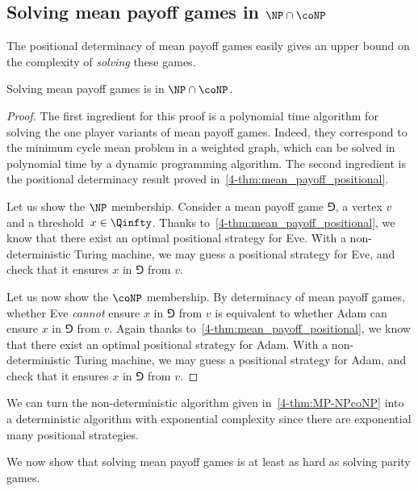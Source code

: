 \subsection*{Solving mean payoff games in $\NP\cap\coNP$}
The positional determinacy of mean payoff games easily gives an upper bound on the complexity of \emph{solving} these games.

\begin{theorem}
\label{4-thm:MP-NPcoNP}
Solving mean payoff games is in $\NP\cap\coNP$.
\end{theorem}
\begin{proof}
The first ingredient for this proof is a polynomial time algorithm for solving the one player variants of mean payoff games.
Indeed, they correspond to the minimum cycle mean problem in a weighted graph,
which can be solved in polynomial time by a dynamic programming algorithm.
The second ingredient is the positional determinacy result proved in~\cref{4-thm:mean_payoff_positional}.

Let us show the $\NP$ membership. 
Consider a mean payoff game $\Game$, a vertex $v$ and a threshold~$x \in \Qinfty$.
Thanks to~\cref{4-thm:mean_payoff_positional}, we know that there exist an optimal positional strategy for Eve.
With a non-deterministic Turing machine, we may guess a positional strategy for Eve, and check that it ensures $x$ in $\Game$ from $v$. 

Let us now show the $\coNP$ membership. 
By determinacy of mean payoff games, whether Eve \emph{cannot} ensure $x$ in $\Game$ from $v$ 
is equivalent to whether Adam can ensure $x$ in $\Game$ from $v$.
Again thanks to~\cref{4-thm:mean_payoff_positional}, we know that there exist an optimal positional strategy for Adam.
With a non-deterministic Turing machine, we may guess a positional strategy for Adam, and check that it ensures $x$ in $\Game$ from $v$. 
\end{proof}

We can turn the non-deterministic algorithm given in~\cref{4-thm:MP-NPcoNP} into a deterministic algorithm 
with exponential complexity since there are exponential many positional strategies.

We now show that solving mean payoff games is at least as hard as solving parity games.

